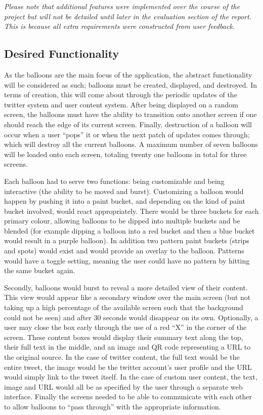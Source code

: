 \begin{center}
\textit{Please note that additional features were implemented over the course of the project but will not be detailed until later in the evaluation section of the report. This is because all extra requirements were constructed from user feedback.}
\end{center}

\subsection{Desired Functionality}
As the balloons are the main focus of the application, the abstract functionality will be considered as such; balloons must be created, displayed, and destroyed. In terms of creation, this will come about through the periodic updates of the twitter system and user content system. After being displayed on a random screen, the balloons must have the ability to transition onto another screen if one should reach the edge of its current screen. Finally, destruction of a balloon will occur when a user ``pops'' it or when the next patch of updates comes through; which will destroy all the current balloons. A maximum number of seven balloons will be loaded onto each screen, totaling twenty one balloons in total for three screens.

Each balloon had to serve two functions: being customizable and being interactive (the ability to be moved and burst). Customizing a balloon would happen by pushing it into a paint bucket, and depending on the kind of paint bucket involved, would react appropriately. There would be three buckets for each primary colour, allowing balloons to be dipped into multiple buckets and be blended (for example dipping a balloon into a red bucket and then a blue bucket would result in a purple balloon). In addition two pattern paint buckets (strips and spots) would exist and would provide an overlay to the balloon. Patterns would have a toggle setting, meaning the user could have no pattern by hitting the same bucket again.

Secondly, balloons would burst to reveal a more detailed view of their content. This view would appear like a secondary window over the main screen (but not taking up a high percentage of the available screen such that the background could not be seen) and after 30 seconds would disappear on its own. Optionally, a user may close the box early through the use of a red ``X'' in the corner of the screen. These content boxes would display their summary text along the top, their full text in the middle, and an image and QR code representing a URL to the original source. In the case of twitter content, the full text would be the entire tweet, the image would be the twitter account's user profile and the URL would simply link to the tweet itself. In the case of custom user content, the text, image and URL would all be as specified by the user through a separate web interface. Finally the screens needed to be able to communicate with each other to allow balloons to ``pass through'' with the appropriate information.

